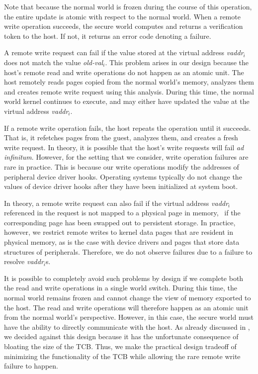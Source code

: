 Note that because the normal world is frozen during the course of this
operation, the entire update is atomic with respect to the normal world. When
a remote write operation succeeds, the secure world computes and returns a
verification token to the host. If not, it returns an error code denoting a
failure.

A remote write request can fail if the value stored at the virtual address
\textit{vaddr}$_i$ does not match the value \textit{old-val}$_i$.  This problem
arises in our design because the host's remote read and write operations do not
happen as an atomic unit. The host remotely reads pages copied from the normal
world's memory, analyzes them and creates remote write request using this
analysis. During this time, the normal world kernel continues to execute, and
may either have updated the value at the virtual address \textit{vaddr}$_i$.

If a remote write operation fails, the host repeats the operation until it
succeeds. That is, it refetches pages from the guest, analyzes them, and
creates a fresh write request. In theory, it is possible that the host's write
requests will fail \textit{ad infinitum}. However, for the setting that we
consider, write operation failures are rare in practice. This is because our
write operations modify the addresses of peripheral device driver hooks.
Operating systems typically do not change the values of device driver hooks
after they have been initialized at system boot. 

In theory, a remote write request can also fail if the virtual address
\textit{vaddr}$_i$ referenced in the request is not mapped to a physical page
in memory, \ie~if the corresponding page has been swapped out to persistent
storage. In practice, however, we restrict remote writes to kernel data pages
that are resident in physical memory, as is the case with device drivers and
pages that store data structures of peripherals. Therefore, we do not observe
failures due to a failure to resolve \textit{vaddr}$_i$s.

It is possible to completely avoid such problems by design if we complete both
the read and write operations in a single world switch. During this time, the
normal world remains frozen and cannot change the view of memory exported to
the host.  The read and write operations will therefore happen as an atomic
unit from the normal world's perspective. However, in this case, the secure
world must have the ability to directly communicate with the host. As already
discussed in , we decided against this
design because it has the unfortunate consequence of bloating the size of the
TCB.  Thus, we make the practical design tradeoff of minimizing the
functionality of the TCB while allowing the rare remote write failure to
happen.

